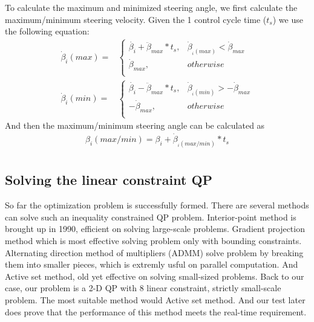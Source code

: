 To calculate the maximum and minimized steering angle, we first calculate the maximum/minimum steering velocity. Given the 1 control cycle time ($t_s$) we use the following equation:
\begin{equation}\label{eq:betaDotMax}
	\begin{split}
		\dot{\beta}_i(max)=&
		\begin{cases}
		\dot{\beta_i}+\ddot{\beta}_{max}*t_s, &\dot{\beta}_{_i(max)}<\dot{\beta}_{max}\\
		\dot{\beta}_{max}, &otherwise\\
		\end{cases}\\
		\dot{\beta}_i(min)=&
		\begin{cases}
		\dot{\beta_i}-\ddot{\beta}_{max}*t_s, &\dot{\beta}_{_i(min)}>-\dot{\beta}_{max}\\
		-\dot{\beta}_{max}, &otherwise\\
		\end{cases}
	\end{split}
\end{equation}
And then the maximum/minimum steering angle can be calculated as 
\begin{equation}\label{eq:betaMax}
	\begin{split}
		\beta_i(max/min)= \beta_i + \dot{\beta}_{_i(max/min)}*t_s\\
	\end{split}
\end{equation}
\subsection{Solving the linear constraint QP}\label{subsec:solveQP}
So far the optimization problem is successfully formed. There are several methods can solve such an inequality constrained QP problem. Interior-point method is brought up in 1990, efficient on solving large-scale problems. Gradient projection method which is most effective solving problem only with bounding constraints. Alternating direction method of multipliers (ADMM) solve problem by breaking them into smaller pieces, which is extremly usful on parallel computation. And Active set method, old yet effective on solving small-sized problems.
Back to our case, our problem is a 2-D QP with 8 linear constraint, strictly small-scale problem. The most suitable method would Active set method. And our test later does prove that the performance of this method meets the real-time requirement.

